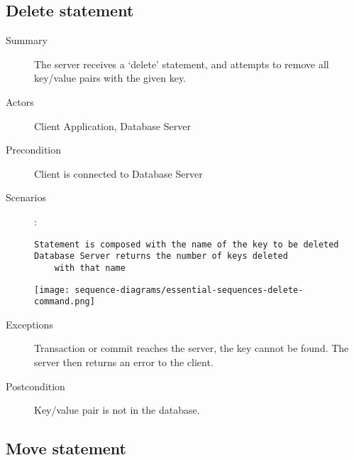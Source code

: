 \documentclass[a4paper]{report}
\begin{document}
	\pagebreak

	\subsection{Delete statement}

	\begin{description}
		\item[Summary] The server receives a ‘delete’ statement, and attempts to remove all key/value pairs with the given key.
		\item[Actors] Client Application, Database Server
		\item[Precondition] Client is connected to Database Server
		\item[Scenarios] :
		
		\begin{lstlisting}
Statement is composed with the name of the key to be deleted
Database Server returns the number of keys deleted
	with that name
		\end{lstlisting}

		\begin{center}
			\texttt{[image: sequence-diagrams/essential-sequences-delete-command.png]}
		\end{center}

		\item[Exceptions] Transaction or commit reaches the server, the key cannot be found.  The server then returns an error to the client.
		\item[Postcondition] Key/value pair is not in the database.
	\end{description}
	
	\pagebreak

	\subsection{Move statement}
\end{document}
